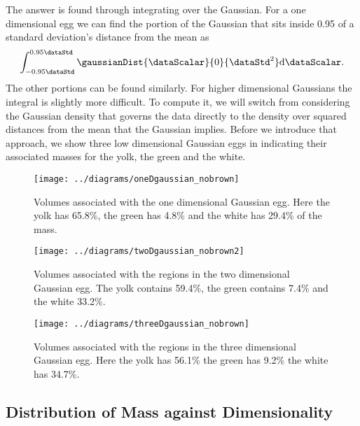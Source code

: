 The answer is found through integrating over the Gaussian. For a one
dimensional egg we can find the portion of the Gaussian that sits
inside 0.95 of a standard deviation's distance from the mean as
\[
\int_{-0.95\dataStd}^{0.95\dataStd} \gaussianDist{\dataScalar}{0}{\dataStd^{2}} \text{d}\dataScalar.
\]
The other portions can be found similarly. For higher dimensional
Gaussians the integral is slightly more difficult. To compute it, we
will switch from considering the Gaussian density that governs the
data directly to the density over squared distances from the mean that
the Gaussian implies. Before we introduce that approach, we show three
low dimensional Gaussian eggs in
 indicating
their associated masses for the yolk, the green and the white.
% 
\begin{figure}
  \begin{center}
    \texttt{[image: ../diagrams/oneDgaussian\_nobrown]}
  \end{center}

  \caption{Volumes associated with the one dimensional Gaussian
    egg. Here the yolk has 65.8\%, the green has 4.8\% and the white
    has 29.4\% of the mass. }\label{fig:oneDGaussianEgg}
\end{figure}

\begin{figure}
  \begin{center}
    \texttt{[image: ../diagrams/twoDgaussian\_nobrown2]}
  \end{center}

  \caption{Volumes associated with the regions in the two dimensional
    Gaussian egg. The yolk contains 59.4\%, the green contains 7.4\%
    and the white 33.2\%.}\label{fig:twoDGaussianEgg}

\end{figure}
\begin{figure}
  \begin{center}
    \texttt{[image: ../diagrams/threeDgaussian\_nobrown]}
  \end{center}

  \caption{Volumes associated with the regions in the three
    dimensional Gaussian egg. Here the yolk has 56.1\% the green has
    9.2\% the white has 34.7\%.}\label{fig:threeDGaussianEgg}
\end{figure}


\subsection{Distribution of Mass against Dimensionality }

